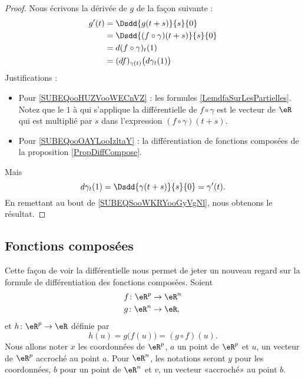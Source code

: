 \begin{proof}
	Nous écrivons la dérivée de \( g\) de la façon suivante :
	\begin{subequations}        \label{SUBEQSooWKRYooGyVgNl}
		\begin{align}
			g'(t) & =\Dsdd{ g(t+s) }{s}{0}                                                \\
			      & =\Dsdd{ (f\circ \gamma)(t+s) }{s}{0}                                  \\
			      & =d(f\circ \gamma)_t(1) \label{SUBEQooHUZVooWECnVZ}                    \\
			      & =(df)_{\gamma(t)}\big( d\gamma_t(1) \big) \label{SUBEQooOAYLooIzltaY} \\
		\end{align}
	\end{subequations}
	Justifications :
	\begin{itemize}
		\item Pour \eqref{SUBEQooHUZVooWECnVZ} : les formules \eqref{LemdfaSurLesPartielles}. Notez que le \( 1\) à qui s'applique la différentielle de \( f\circ\gamma\) est le vecteur de \( \eR\) qui est multiplié par \( s\) dans l'expression \( (f\circ\gamma)(t+s)\).
		\item
		      Pour \eqref{SUBEQooOAYLooIzltaY} : la différentiation de fonctions composées de la proposition \ref{PropDiffCompose}.
	\end{itemize}
	Mais
	\begin{equation}
		d\gamma_t(1)=\Dsdd{ \gamma(t+s) }{s}{0}=\gamma'(t).
	\end{equation}
	En remettant au bout de \eqref{SUBEQSooWKRYooGyVgNl}, nous obtenons le résultat.
\end{proof}

\subsection{Fonctions composées}

Cette façon de voir la différentielle nous permet de jeter un nouveau regard sur la formule de différentiation des fonctions composées. Soient
\begin{equation}
	\begin{aligned}[]
		f\colon \eR^p & \to \eR^n \\
		g\colon \eR^n & \to \eR,
	\end{aligned}
\end{equation}
et \( h\colon \eR^p\to \eR\) définie par
\begin{equation}
	h(u)=g\big( f(u) \big)=(g\circ f)(u).
\end{equation}
Nous allons noter \( x\) les coordonnées de \( \eR^p\), \( a\) un point de \( \eR^p\) et \( u\), un vecteur de \( \eR^p\) accroché au point \( a\). Pour \( \eR^n\), les notations seront \( y\) pour les coordonnées, \( b\) pour un point de \( \eR^n\) et \( v\), un vecteur «accroché» au point \( b\).

